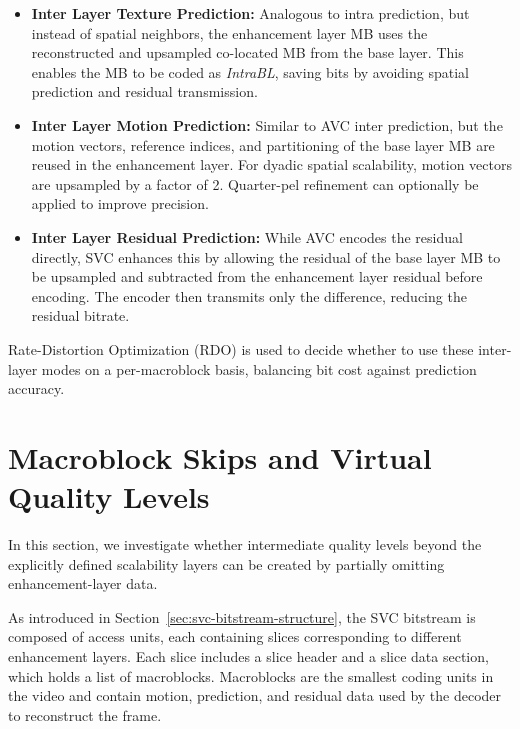     \begin{itemize}
        \item 
            \textbf{Inter Layer Texture Prediction:} 
            Analogous to intra prediction, but instead of spatial neighbors, the
            enhancement layer MB uses the reconstructed and upsampled co-located
            MB from the base layer. This enables the MB to be coded as
            \textit{IntraBL}, saving bits by avoiding spatial prediction and
            residual transmission.

        \item 
            \textbf{Inter Layer Motion Prediction:} 
            Similar to AVC inter prediction, but the motion vectors, reference
            indices, and partitioning of the base layer MB are reused in the
            enhancement layer. For dyadic spatial scalability, motion vectors
            are upsampled by a factor of 2. Quarter-pel refinement can
            optionally be applied to improve precision.

        \item 
            \textbf{Inter Layer Residual Prediction:} 
            While AVC encodes the residual directly, SVC enhances this by
            allowing the residual of the base layer MB to be upsampled and
            subtracted from the enhancement layer residual before encoding. The
            encoder then transmits only the difference, reducing the residual
            bitrate.

    \end{itemize}

    Rate-Distortion Optimization (RDO) is used to decide whether to use these
    inter-layer modes on a per-macroblock basis, balancing bit cost against
    prediction accuracy.


\section{Macroblock Skips and Virtual Quality Levels}
\label{sec:virtual_quality_levels}
    In this section, we investigate whether intermediate quality levels beyond
    the explicitly defined scalability layers can be created by partially
    omitting enhancement-layer data.

    As introduced in Section~\ref{sec:svc-bitstream-structure}, the SVC
    bitstream is composed of access units, each containing slices corresponding
    to different enhancement layers. Each slice includes a slice header and a
    slice data section, which holds a list of macroblocks. Macroblocks are the
    smallest coding units in the video and contain motion, prediction, and
    residual data used by the decoder to reconstruct the frame.

